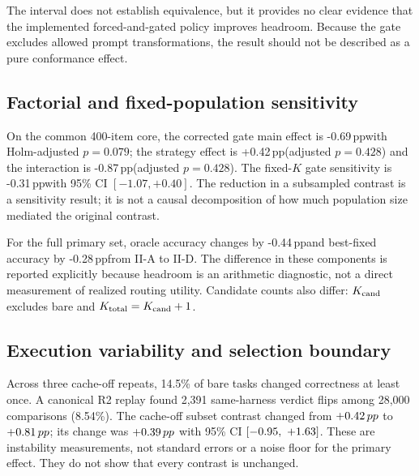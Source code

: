 \documentclass{article}
\newcommand{\pp}{\,pp}
\begin{document}
The interval does not establish equivalence, but it provides no clear evidence
that the implemented forced-and-gated policy improves headroom. Because the
gate excludes allowed prompt transformations, the result should not be
described as a pure conformance effect.

\subsection{Factorial and fixed-population sensitivity}

On the common 400-item core, the corrected gate main effect is -0.69\pp with
Holm-adjusted $p=0.079$; the strategy effect is +0.42\pp (adjusted $p=0.428$)
and the interaction is -0.87\pp (adjusted $p=0.428$). The fixed-$K$ gate
sensitivity is -0.31\pp with 95\% CI $[-1.07,+0.40]$. The reduction in a
subsampled contrast is a sensitivity result; it is not a causal decomposition
of how much population size mediated the original contrast.

\begin{table}[H]
\centering\small

\caption{Corrected factorial reanalysis on the common core. Gate, strategy,
and interaction estimands are defined by the four arm means. Raw tests use
cell sign flips and Holm correction covers the three secondary contrasts.}
\label{tab:factorial}
\end{table}

For the full primary set, oracle accuracy changes by -0.44\pp and best-fixed
accuracy by -0.28\pp from II-A to II-D. The difference in these components is
reported explicitly because headroom is an arithmetic diagnostic, not a
direct measurement of realized routing utility. Candidate counts also differ:
$K_{\rm cand}$ excludes bare and $K_{\rm total}=K_{\rm cand}+1$.

\begin{table}[H]
\centering\footnotesize

\caption{Same-core decomposition. All arms share the same bare outcomes.
Headroom is oracle accuracy minus best-fixed accuracy; it is not selector
accuracy.}
\label{tab:decomp}
\end{table}

\subsection{Execution variability and selection boundary}

Across three cache-off repeats, 14.5\% of bare tasks changed correctness at
least once. A canonical R2 replay found 2,391 same-harness verdict flips among
28,000 comparisons (8.54\%). The cache-off subset contrast changed from
$\RevisionRtwoCached\pp$ to $\RevisionRtwoOff\pp$; its change was
$\RevisionRtwoChange\pp$ with 95\% CI $[-0.95,\ +1.63]$. These are
instability measurements, not standard errors or a noise floor for the primary
effect. They do not show that every contrast is unchanged.
\end{document}

